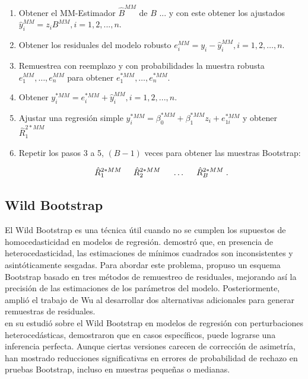 \begin{enumerate}
	\item Obtener el MM-Estimador $\hat{B}^{MM}$ de $B$ ... y con este  obtener los ajustados $ \hat{y}^{MM}_{i} = z_{i}B^{MM},i=1,2,..., n$.
	
	\item Obtener los residuales del modelo robusto $ e^{MM}_{i} = y_{i}-\hat{y}^{MM}_{i},i = 1,2, \dots, n$.
	
	\item Remuestrea con reemplazo y con probabilidades la muestra robusta $ e^{MM}_{1},\dots, e^{MM}_{n}$ para obtener $ e^{*MM}_{1},\dots, e^{*MM}_{n}$.
	
	\item Obtener $y^{*MM}_{i} = e^{*MM}_{i} + \hat{y}^{MM}_{i},i=1,2,..., n  $.
	
	\item Ajustar una regresión simple $ y^{*MM}_{i} = \beta_{0}^{*MM}+\beta_{1}^{*MM}z_{i} + e^{*MM}_{1i}$ y obtener $\hat{R}^{2*MM}_{1}$
	
	\item Repetir los pasos 3 a 5, $(B-1)$ veces para obtener las muestras Bootstrap:
	
	\[
	\hat{R}^{2*MM}_{1} \hspace{.5cm} \hat{R}^{2*MM}_{2} \hspace{.5cm} \dots \hspace{.5cm} \hat{R}^{2*MM}_{B} \; .
	\]
\end{enumerate}



\subsection{Wild Bootstrap}
El Wild Bootstrap es una técnica útil cuando no se cumplen los supuestos de homocedasticidad en modelos de regresión. \textcite{wu-1986} demostró que, en presencia de heterocedasticidad, las estimaciones de mínimos cuadrados son inconsistentes y asintóticamente sesgadas. Para abordar este problema, propuso un esquema Bootstrap basado en tres métodos de remuestreo de residuales, mejorando así la precisión de las estimaciones de los parámetros del modelo. Posteriormente, \textcite{liu-1988} amplió el trabajo de Wu al desarrollar dos alternativas adicionales para generar remuestras de residuales. \\


\textcite{russell-2008} en su estudió sobre el Wild Bootstrap en modelos de regresión con perturbaciones heterocedásticas, demostraron que en casos específicos, puede lograrse una inferencia perfecta. Aunque ciertas versiones carecen de corrección de asimetría, han mostrado reducciones significativas en errores de probabilidad de rechazo en pruebas Bootstrap, incluso en muestras pequeñas o medianas.\\

